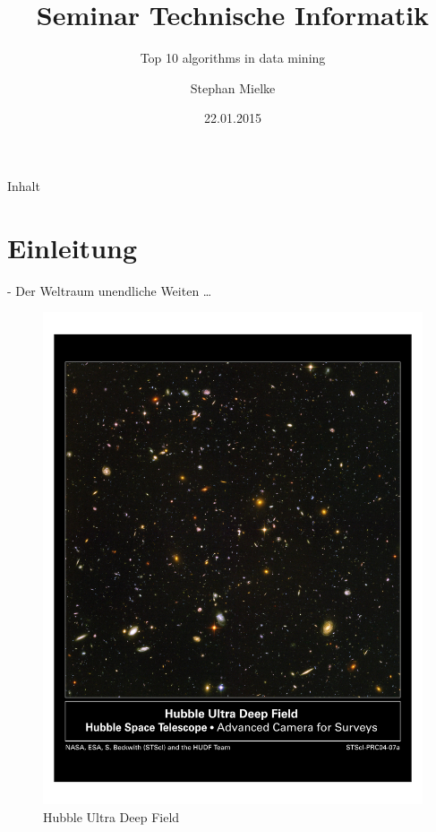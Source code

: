 \documentclass[fleqn,11pt,aspectratio=43]{beamer}
\title{Seminar Technische Informatik}
\subtitle{Top 10 algorithms in data mining}
\author{Stephan Mielke}
\date{22.01.2015}
\begin{document}
\begin{frame}
\titlepage
\end{frame}

\begin{frame}{Inhalt}
\tableofcontents
\end{frame}

\section*{Einleitung~}

\begin{frame}[plain]{\insertsectionhead - Der Weltraum unendliche Weiten \dots}

\begin{figure}
\includegraphics[scale=0.6,trim={40 400 40 80},clip]{hs-2004-07-a-pdf}
\caption{Hubble Ultra Deep Field \cite{HUDF}}
\label{fig:hs-2004-07-a-pdf}
\end{figure}
\end{frame}
\end{document}
